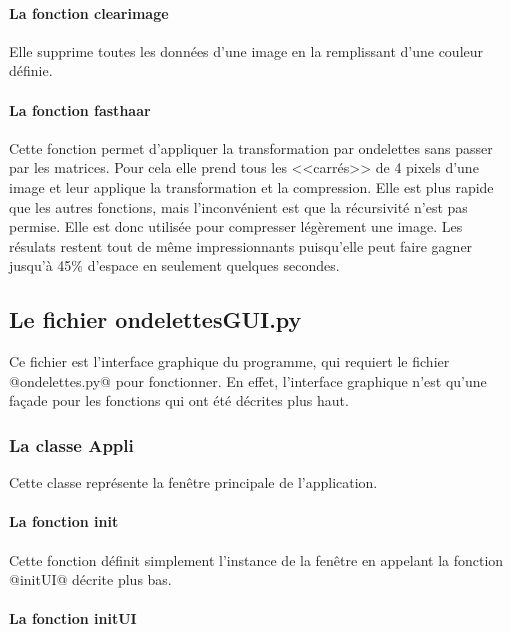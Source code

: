 \documentclass{article}
\begin{document}
\paragraph{La fonction clearimage}

Elle supprime toutes les données d'une image en la remplissant d'une couleur définie.

\paragraph{La fonction fasthaar}

Cette fonction permet d'appliquer la transformation par ondelettes sans passer par les matrices. Pour cela elle prend tous les <<carrés>> de 4 pixels d'une image et leur applique la transformation et la compression. Elle est plus rapide que les autres fonctions, mais l'inconvénient est que la récursivité n'est pas permise. Elle est donc utilisée pour compresser légèrement une image. Les résulats restent tout de même impressionnants puisqu'elle peut faire gagner jusqu'à 45\% d'espace en seulement quelques secondes.


\subsection{Le fichier ondelettesGUI.py}

Ce fichier est l'interface graphique du programme, qui requiert le fichier @ondelettes.py@ pour fonctionner. En effet, l'interface graphique n'est qu'une façade pour les fonctions qui ont été décrites plus haut.

\subsubsection{La classe Appli}

Cette classe représente la fenêtre principale de l'application.

\paragraph{La fonction init}

Cette fonction définit simplement l'instance de la fenêtre en appelant la fonction @initUI@ décrite plus bas.

\paragraph{La fonction initUI}
\end{document}
